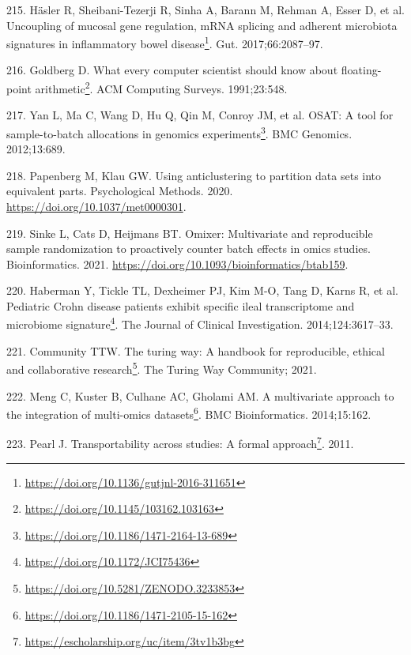 \documentclass[
  a4paper,
]{book}
\DeclareRobustCommand{\href}[2]{#2\footnote{\url{#1}}}
\newlength{\cslhangindent}
\newlength{\cslentryspacingunit} %
\newenvironment{CSLReferences}[2] %
 {%
  \setlength{\parindent}{0pt}
  \ifodd #1
  \let\oldpar\par
  \def\par{\hangindent=\cslhangindent\oldpar}
  \fi
  \setlength{\parskip}{#2\cslentryspacingunit}
 }%
 {}
\begin{document}
\begin{CSLReferences}{0}{0}
\leavevmode{}%
215. Häsler R, Sheibani-Tezerji R, Sinha A, Barann M, Rehman A, Esser D, et al. \href{https://doi.org/10.1136/gutjnl-2016-311651}{Uncoupling of mucosal gene regulation, mRNA splicing and adherent microbiota signatures in inflammatory bowel disease}. Gut. 2017;66:2087--97.

\leavevmode{}%
216. Goldberg D. \href{https://doi.org/10.1145/103162.103163}{What every computer scientist should know about floating-point arithmetic}. ACM Computing Surveys. 1991;23:548.

\leavevmode{}%
217. Yan L, Ma C, Wang D, Hu Q, Qin M, Conroy JM, et al. \href{https://doi.org/10.1186/1471-2164-13-689}{OSAT: A tool for sample-to-batch allocations in genomics experiments}. BMC Genomics. 2012;13:689.

\leavevmode{}%
218. Papenberg M, Klau GW. Using anticlustering to partition data sets into equivalent parts. Psychological Methods. 2020. \url{https://doi.org/10.1037/met0000301}.

\leavevmode{}%
219. Sinke L, Cats D, Heijmans BT. Omixer: Multivariate and reproducible sample randomization to proactively counter batch effects in omics studies. Bioinformatics. 2021. \url{https://doi.org/10.1093/bioinformatics/btab159}.

\leavevmode{}%
220. Haberman Y, Tickle TL, Dexheimer PJ, Kim M-O, Tang D, Karns R, et al. \href{https://doi.org/10.1172/JCI75436}{Pediatric Crohn disease patients exhibit specific ileal transcriptome and microbiome signature}. The Journal of Clinical Investigation. 2014;124:3617--33.

\leavevmode{}%
221. Community TTW. \href{https://doi.org/10.5281/ZENODO.3233853}{The turing way: A handbook for reproducible, ethical and collaborative research}. The Turing Way Community; 2021.

\leavevmode{}%
222. Meng C, Kuster B, Culhane AC, Gholami AM. \href{https://doi.org/10.1186/1471-2105-15-162}{A multivariate approach to the integration of multi-omics datasets}. BMC Bioinformatics. 2014;15:162.

\leavevmode{}%
223. Pearl J. \href{https://escholarship.org/uc/item/3tv1b3bg}{Transportability across studies: A formal approach}. 2011.


\end{CSLReferences}
\end{document}
